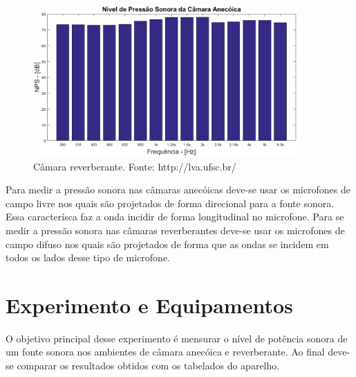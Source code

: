 \begin{figure}[h!]
    \centering
    \includegraphics[width=0.9\textwidth]{figuras/P_anecoica.eps}
    \caption{Câmara reverberante. Fonte: http://lva.ufsc.br/}
    \label{figura_2}
\end{figure}

Para medir a pressão sonora nas câmaras anecóicas deve-se usar os microfones de campo livre nos quais são projetados de forma direcional para a fonte sonora. Essa caracterísca faz a onda incidir de forma longitudinal no microfone. Para se medir a pressão sonora nas câmaras reverberantes deve-se usar os microfones de campo difuso nos quais são projetados de forma que as ondas se incidem em todos os lados desse tipo de microfone.


\chapter{Experimento e Equipamentos}\label{descricao}

O objetivo principal desse experimento é mensurar o nível de potência sonora de um fonte sonora nos ambientes de câmara anecóica e reverberante. Ao final deve-se comparar os resultados obtidos com os tabelados do aparelho.

